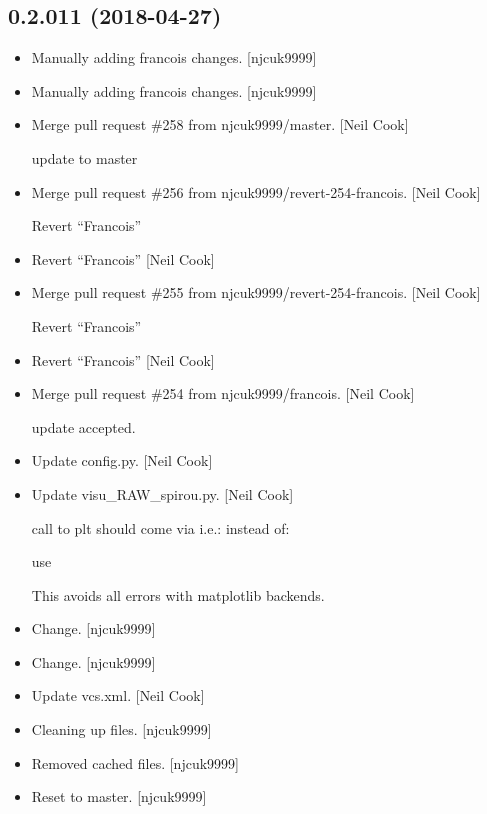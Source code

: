 \documentclass[a4paper,10pt,english]{report}
\begin{document}
\subsection{0.2.011 (2018-04-27)}
\label{\detokenize{misc/changelog:id450}}\begin{itemize}
\item {} 
Manually adding francois changes. {[}njcuk9999{]}

\item {} 
Manually adding francois changes. {[}njcuk9999{]}

\item {} 
Merge pull request \#258 from njcuk9999/master. {[}Neil Cook{]}

update to master

\item {} 
Merge pull request \#256 from njcuk9999/revert-254-francois. {[}Neil
Cook{]}

Revert “Francois”

\item {} 
Revert “Francois” {[}Neil Cook{]}

\item {} 
Merge pull request \#255 from njcuk9999/revert-254-francois. {[}Neil
Cook{]}

Revert “Francois”

\item {} 
Revert “Francois” {[}Neil Cook{]}

\item {} 
Merge pull request \#254 from njcuk9999/francois. {[}Neil Cook{]}

update accepted.

\item {} 
Update config.py. {[}Neil Cook{]}

\item {} 
Update visu\_RAW\_spirou.py. {[}Neil Cook{]}

call to plt should come via  i.e.:
instead of:

use


This avoids all errors with matplotlib backends.

\item {} 
Change. {[}njcuk9999{]}

\item {} 
Change. {[}njcuk9999{]}

\item {} 
Update vcs.xml. {[}Neil Cook{]}

\item {} 
Cleaning up files. {[}njcuk9999{]}

\item {} 
Removed cached files. {[}njcuk9999{]}

\item {} 
Reset to master. {[}njcuk9999{]}

\end{itemize}
\end{document}
